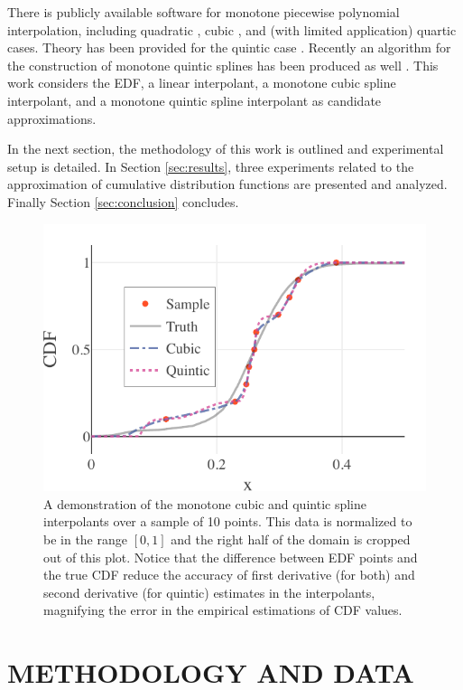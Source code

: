 \documentclass[letterpaper, 10 pt, conference]{ieeeconf}  %
\begin{document}
There is publicly available software for monotone piecewise polynomial interpolation, including quadratic \cite{he1998monotone}, cubic \cite{fritsch1980monotone}, and (with limited application) quartic \cite{wang2004rational,piah2011improved,yao2018unconditionally} cases. Theory has been provided for the quintic case \cite{ulrich1994positivity,hess1994positive}. Recently an algorithm for the construction of monotone quintic splines has been produced as well \cite{lux2020algorithm}.
This work considers the EDF, a linear interpolant, a monotone cubic spline interpolant, and a monotone quintic spline interpolant as candidate approximations.

In the next section, the methodology of this work is outlined and experimental setup is detailed. In Section \ref{sec:results}, three experiments related to the approximation of cumulative distribution functions are presented and analyzed. Finally Section \ref{sec:conclusion} concludes.


\begin{figure}
  \vspace{-.3cm}
  \includegraphics[width=.5\textwidth]{cq-sample-prediction.pdf}
  \caption{A demonstration of the monotone cubic and quintic spline interpolants over a sample of 10 points. This data is normalized to be in the range $[0,1]$ and the right half of the domain is cropped out of this plot. Notice that the difference between EDF points and the true CDF reduce the accuracy of first derivative (for both) and second derivative (for quintic) estimates in the interpolants, magnifying the error in the empirical estimations of CDF values.
  }
  \label{fig:sample-prediction}
\end{figure}

\section{METHODOLOGY AND DATA}
\label{sec:methodology}
\end{document}

